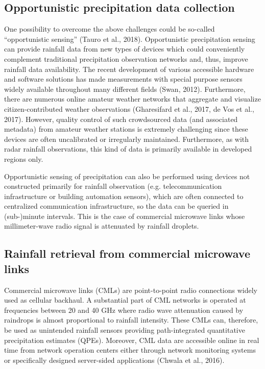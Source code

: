 \documentclass{ctuthesis}\usepackage[]{graphicx}\usepackage[]{color}
\begin{document}
\subsection{Opportunistic precipitation data collection}

One possibility to overcome the above challenges could be so-called \enquote{opportunistic sensing} (Tauro et al., 2018). Opportunistic precipitation sensing can provide rainfall data from new types of devices which could conveniently complement traditional precipitation observation networks and, thus, improve rainfall data availability. The recent development of various accessible hardware and software solutions has made measurements with special purpose sensors widely available throughout many different fields (Swan, 2012). Furthermore, there are numerous online amateur weather networks that aggregate and visualize citizen-contributed weather observations (Gharesifard et al., 2017, de Vos et al., 2017). However, quality control of such crowdsourced data (and associated metadata) from amateur weather stations is extremely challenging since these devices are often uncalibrated or irregularly maintained. Furthermore, as with radar rainfall observations, this kind of data is primarily available in developed regions only.

Opportunistic sensing of precipitation can also be performed using devices not constructed primarily for rainfall observation (e.g. telecommunication infrastructure or building automation sensors), which are often connected to centralized communication infrastructure, so the data can be queried in (sub-)minute intervals. This is the case of commercial microwave links whose millimeter-wave radio signal is attenuated by rainfall droplets.

\subsection{Rainfall retrieval from commercial microwave links}

Commercial microwave links (CMLs) are point-to-point radio connections widely used as cellular backhaul. A substantial part of CML networks is operated at frequencies between 20 and 40 GHz where radio wave attenuation caused by raindrops is almost proportional to rainfall intensity. These CMLs can, therefore, be used as unintended rainfall sensors providing path-integrated quantitative precipitation estimates (QPEs). Moreover, CML data are accessible online in real time from network operation centers either through network monitoring systems or specifically designed server-sided applications (Chwala et al., 2016).
\end{document}

